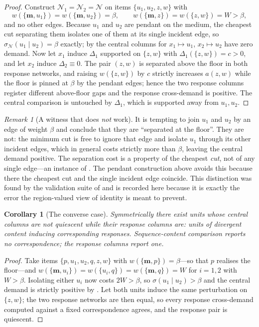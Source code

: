 \documentclass[11pt,twocolumn,a4paper]{article}
\newtheorem{corollary}[theorem]{Corollary}
\theoremstyle{definition}
\theoremstyle{remark}
\newtheorem{remark}[theorem]{Remark}
\newcommand{\med}{\mathbf{m}}
\newcommand{\wt}{w}
\newcommand{\flo}{\beta}
\newcommand{\sep}{\sigma}
\newcommand{\al}{a}
\newcommand{\netw}{\mathcal{N}}
\newcommand{\Perturb}{\Delta}
\begin{document}
\begin{proof}
Construct $\netw_1=\netw_2=\netw$ on items $\{u_1,u_2,z,w\}$ with
\[
  \wt(\{\med,u_1\})=\wt(\{\med,u_2\})=\flo,
  \qquad
  \wt(\{\med,z\})=\wt(\{z,w\})=W>\flo,
\]
and no other edges. Because $u_1$ and $u_2$ are pendant on the medium,
the cheapest cut separating them isolates one of them at its single
incident edge, so $\sep_\netw(u_1\mid u_2)=\flo$ exactly; by
 the central columns for $x_1\mapsto u_1$,
$x_2\mapsto u_2$ have zero demand. Now let $x_1$ induce $\Perturb_1$
supported on $\{z,w\}$ with $\Perturb_1(\{z,w\})=c>0$, and let $x_2$
induce $\Perturb_2\equiv0$. The pair $(z,w)$ is separated above the floor
in both response networks, and raising $\wt(\{z,w\})$ by $c$ strictly
increases $\al(z,w)$ while the floor is pinned at $\flo$ by the pendant
edges; hence the two response columns register different above-floor
gaps and the response cross-demand is positive. The central comparison is
untouched by $\Perturb_1$, which is supported away from $u_1,u_2$.
\end{proof}

\begin{remark}[A witness that does \emph{not} work]
\label{rem:badwitness}
It is tempting to join $u_1$ and $u_2$ by an edge of weight $\flo$ and
conclude that they are ``separated at the floor''. They are not: the
minimum cut is free to ignore that edge and isolate $u_1$ through its
other incident edges, which in general costs strictly more than $\flo$,
leaving the central demand positive. The separation cost is a property of
the cheapest \emph{cut}, not of any single edge---an instance of
. The pendant construction above avoids this because
there the cheapest cut and the single incident edge coincide. This
distinction was found by the validation suite of 
and is recorded here because it is exactly the error the region-valued
view of identity is meant to prevent.
\end{remark}

\begin{corollary}[The converse case]
\label{cor:converse}
Symmetrically there exist units whose central columns are not quiescent
while their response columns are: units of divergent content inducing
corresponding responses. Sequence-content comparison reports no
correspondence; the response columns report one.
\end{corollary}

\begin{proof}
Take items $\{p,u_1,u_2,q,z,w\}$ with $\wt(\{\med,p\})=\flo$---so that
$p$ realises the floor---and
$\wt(\{\med,u_i\})=\wt(\{u_i,q\})=\wt(\{\med,q\})=W$ for $i=1,2$ with
$W>\flo$. Isolating either $u_i$ now costs $2W>\flo$, so
$\sep(u_1\mid u_2)>\flo$ and the central demand is strictly positive by
. Let both units induce the same perturbation on
$\{z,w\}$; the two response networks are then equal, so every response
cross-demand computed against a fixed correspondence agrees, and the
response pair is quiescent.
\end{proof}
\end{document}
